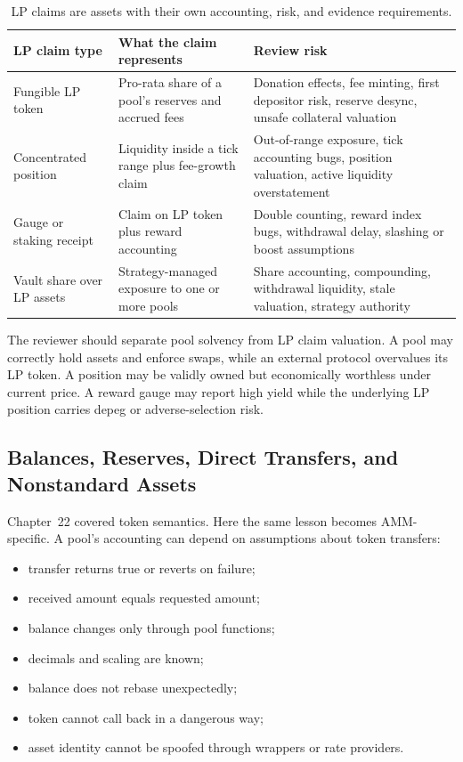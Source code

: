 \begin{table}[htbp]
\centering
\small
\renewcommand{\arraystretch}{1.16}
\begin{tabularx}{\textwidth}{@{}>{\RaggedRight\arraybackslash}p{}>{\RaggedRight\arraybackslash}p{}X@{}}
\toprule
LP claim type & What the claim represents & Review risk \\
\midrule
Fungible LP token & Pro-rata share of a pool's reserves and accrued fees & Donation effects, fee minting, first depositor risk, reserve desync, unsafe collateral valuation \\
Concentrated position & Liquidity inside a tick range plus fee-growth claim & Out-of-range exposure, tick accounting bugs, position valuation, active liquidity overstatement \\
Gauge or staking receipt & Claim on LP token plus reward accounting & Double counting, reward index bugs, withdrawal delay, slashing or boost assumptions \\
Vault share over LP assets & Strategy-managed exposure to one or more pools & Share accounting, compounding, withdrawal liquidity, stale valuation, strategy authority \\
\bottomrule
\end{tabularx}
\caption{LP claims are assets with their own accounting, risk, and evidence requirements.}
\end{table}

The reviewer should separate pool solvency from LP claim valuation. A pool may correctly hold assets and enforce swaps, while an external protocol overvalues its LP token. A position may be validly owned but economically worthless under current price. A reward gauge may report high yield while the underlying LP position carries depeg or adverse-selection risk.

\subsection{Balances, Reserves, Direct Transfers, and Nonstandard Assets}

Chapter~22 covered token semantics. Here the same lesson becomes AMM-specific. A pool's accounting can depend on assumptions about token transfers:

\begin{itemize}
\item transfer returns true or reverts on failure;
\item received amount equals requested amount;
\item balance changes only through pool functions;
\item decimals and scaling are known;
\item balance does not rebase unexpectedly;
\item token cannot call back in a dangerous way;
\item asset identity cannot be spoofed through wrappers or rate providers.
\end{itemize}

